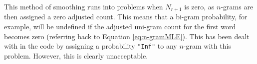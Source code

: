 %

This method of smoothing runs into problems when $N_{r+1}$ is zero, as $n$-grams are then assigned a zero adjusted count. This means that a bi-gram probability, for example, will be undefined if the adjusted uni-gram count for the first word becomes zero (referring back to Equation \ref{eq:n-gramMLE}). This has been dealt with in the code by assigning a probability \lstinline!"Inf"! to any $n$-gram with this problem. However, this is clearly unacceptable.


